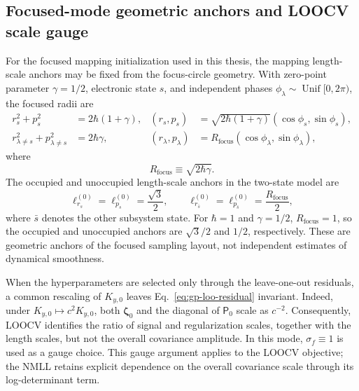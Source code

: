 \documentclass[
  11pt,
  letterpaper,
  onehalfspacing,
  normalmargins,
  equalmargins,
  oneside
]{ut-thesis}
\begin{document}
\subsection{Focused-mode geometric anchors and LOOCV scale gauge}
\label{subsec:focused-mode-hyperparameter-anchors}

For the focused mapping initialization used in this thesis, the mapping
length-scale anchors may be fixed from the focus-circle geometry. With
zero-point parameter \(\gamma=1/2\), electronic state \(s\), and independent
phases \(\phi_\lambda\sim\operatorname{Unif}[0,2\pi)\), the focused radii are
\begin{align}
r_s^2+p_s^2
&=
2\hbar(1+\gamma),
&
(r_s,p_s)
&=
\sqrt{2\hbar(1+\gamma)}
(\cos\phi_s,\sin\phi_s),
\label{eq:focused-occupied-radius}
\\
r_{\lambda\ne s}^2+p_{\lambda\ne s}^2
&=
2\hbar\gamma,
&
(r_\lambda,p_\lambda)
&=
R_{\mathrm{focus}}
(\cos\phi_\lambda,\sin\phi_\lambda),
\label{eq:focused-unoccupied-radius}
\end{align}
where
\begin{equation}
R_{\mathrm{focus}}
\equiv
\sqrt{2\hbar\gamma}.
\label{eq:focused-radius-definition}
\end{equation}
The occupied and unoccupied length-scale anchors in the two-state model are
\begin{equation}
\ell_{r_s}^{(0)}
=
\ell_{p_s}^{(0)}
=
\frac{\sqrt{3}}{2},
\qquad
\ell_{r_{\bar s}}^{(0)}
=
\ell_{p_{\bar s}}^{(0)}
=
\frac{R_{\mathrm{focus}}}{2},
\label{eq:focused-mapping-lengthscale-anchors}
\end{equation}
where \(\bar s\) denotes the other subsystem state. For
\(\hbar=1\) and \(\gamma=1/2\),
\(R_{\mathrm{focus}}=1\), so the occupied and unoccupied anchors are
\(\sqrt{3}/2\) and \(1/2\), respectively. These are geometric anchors of the
focused sampling layout, not independent estimates of dynamical smoothness.

When the hyperparameters are selected only through the leave-one-out residuals,
a common rescaling of \(K_{y,0}\) leaves
Eq.~\eqref{eq:gp-loo-residual} invariant. Indeed, under
\(K_{y,0}\mapsto c^2K_{y,0}\), both \(\boldsymbol\zeta_0\) and the diagonal
of \(\mathsf P_0\) scale as \(c^{-2}\). Consequently, LOOCV identifies the ratio of
signal and regularization scales, together with the length scales, but not the
overall covariance amplitude. In this mode, \(\sigma_f\equiv1\) is used as a
gauge choice. This gauge argument applies to the LOOCV objective; the NMLL
retains explicit dependence on the overall covariance scale through its
log-determinant term.
\end{document}

